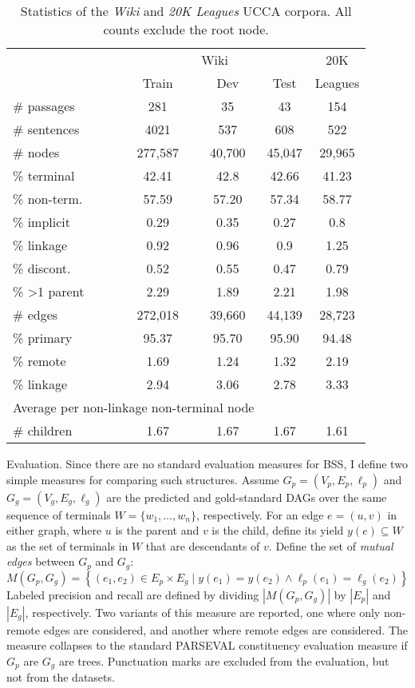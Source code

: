 \documentclass[11pt]{article}
\makeatletter
\renewcommand{\paragraph}{
  \@startsection{paragraph}{4}
  {\z@}{.3ex \@plus .3ex \@minus .2ex}{-1em}
  {\normalfont\normalsize\bfseries}
}
\makeatother
\begin{document}
\begin{table}
  \centering
\begin{tabular}{l|ccc|c}
& \multicolumn{3}{c|}{Wiki} & 20K \\
& \small Train & \small Dev & \small Test & Leagues \\
\hline
\# passages & 281 & 35 & 43 & 154 \\
\# sentences & 4021 & 537 & 608 & 522 \\
\hline
\# nodes & 277,587 & 40,700 & 45,047 & 29,965 \\
\% terminal & 42.41 & 42.8 & 42.66 & 41.23 \\
\% non-term. & 57.59 & 57.20 & 57.34 & 58.77 \\
\% implicit & 0.29 & 0.35 & 0.27 & 0.8 \\
\% linkage & 0.92 & 0.96 & 0.9 & 1.25 \\
\% discont. & 0.52 & 0.55 & 0.47 & 0.79 \\
\% \textgreater 1 parent & 2.29 & 1.89 & 2.21 & 1.98 \\
\hline
\# edges & 272,018 & 39,660 & 44,139 & 28,723 \\
\% primary & 95.37 & 95.70 & 95.90 & 94.48 \\
\% remote & 1.69 & 1.24 & 1.32 & 2.19 \\
\% linkage & 2.94 & 3.06 & 2.78 & 3.33 \\
\hline
\multicolumn{3}{l}{\footnotesize Average per non-linkage non-terminal node} \\
\# children & 1.67 & 1.67 & 1.67 & 1.61 
\end{tabular}
\caption{Statistics of the \textit{Wiki} and \textit{20K Leagues} UCCA corpora.
All counts exclude the root node.
}
\label{table:data}
\end{table}

\paragraph{Evaluation.}
Since there are no standard evaluation measures for BSS, I define
two simple measures for comparing such structures.
Assume $G_p=(V_p,E_p,\ell_p)$ and $G_g=(V_g,E_g,\ell_g)$
are the predicted and gold-standard DAGs over the same
sequence of terminals $W = \{w_1,\ldots,w_n\}$, respectively.
For an edge $e=(u,v)$ in either graph,
where $u$ is the parent and $v$ is the child, define its yield $y(e) \subseteq W$ as the
set of terminals in $W$ that are descendants of $v$.
Define the set of \textit{mutual edges} between $G_p$ and $G_g$:
\[
  M(G_p,G_g) =
  \left\{(e_1,e_2) \in E_p \times E_g \;|\;
  y(e_1) = y(e_2) \wedge \ell_p(e_1)=\ell_g(e_2)\right\}
\]
Labeled precision and recall are defined by dividing $|M(G_p,G_g)|$ by $|E_p|$ and $|E_g|$, respectively.
Two variants of this measure are reported, one where only non-remote edges are considered,
and another where remote edges are considered. The measure collapses to the standard
PARSEVAL constituency evaluation measure if $G_p$ are $G_g$ are trees.
Punctuation marks are excluded from the evaluation, but not from the datasets.
\end{document}
